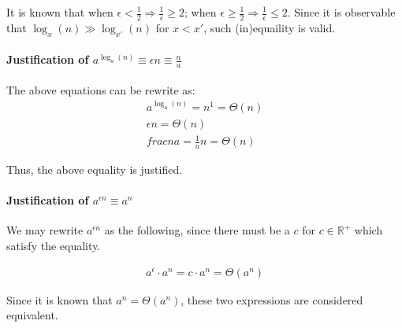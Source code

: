 \documentclass[12pt]{article}
\begin{document}
It is known that when $\epsilon < \frac{1}{2} \Rightarrow \frac{1}{\epsilon} \geq 2$; when $\epsilon \geq \frac{1}{2} \Rightarrow  \frac{1}{\epsilon} \leq 2$. Since it is observable that $\log_{x}(n) \gg \log_{x'}(n)$ for $x < x'$, such (in)equaility is valid.


\paragraph{Justification of $a^{\log_a(n)} \equiv \epsilon n \equiv \frac{n}{a}$\newline}

The above equations can be rewrite as:
\begin{gather}
    a^{\log_a(n)} = n^1 = \Theta(n) \\
    \epsilon n = \Theta(n) \\
    frac{n}{a} = \frac{1}{a}n =  \Theta(n)
\end{gather}

Thus, the above equality is justified.

\paragraph{Justification of $a^{\epsilon n} \equiv a^n$\newline}

We may rewrite $a^{\epsilon n}$ as the following, since there must be a $c$ for $c \in \mathbb{R^+}$ which satisfy the equality.

\begin{gather}
    a^{\epsilon} \cdot a^n = c \cdot a^n = \Theta(a^n)
\end{gather}

Since it is known that $a^n = \Theta(a^n)$, these two expressions are considered equivalent.

%
% 
% 
\end{document}
